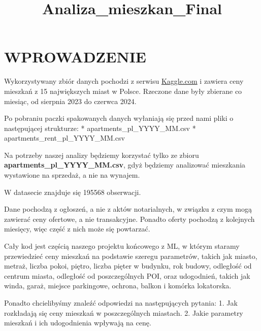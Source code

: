 \documentclass[11pt]{article}
\title{Analiza\_mieszkan\_Final}
\begin{document}
    
    \maketitle
    
    

    
    \section{WPROWADZENIE}\label{wprowadzenie}

Wykorzystywany zbiór danych pochodzi z serwisu
\href{https://www.kaggle.com/datasets/krzysztofjamroz/apartment-prices-in-poland/data}{Kaggle.com}
i zawiera ceny mieszkań z 15 największych miast w Polsce. Rzeczone dane
były zbierane co miesiąc, od sierpnia 2023 do czerwca 2024.

Po pobraniu paczki spakowanych danych wyłaniają się przed nami pliki o
następującej strukturze: * apartments\_pl\_YYYY\_MM.csv *
apartments\_rent\_pl\_YYYY\_MM.csv

Na potrzeby naszej analizy będziemy korzystać tylko ze zbioru
\textbf{apartments\_pl\_YYYY\_MM.csv}, gdyż będziemy analizować
mieszkania wystawione na sprzedaż, a nie na wynajem.

W datasecie znajduje się 195568 obserwacji.

Dane pochodzą z ogłoszeń, a nie z aktów notarialnych, w związku z czym
mogą zawierać ceny ofertowe, a nie transakcyjne. Ponadto oferty pochodzą
z kolejnych miesięcy, więc część z nich może się powtarzać.

Cały kod jest częścią naszego projektu końcowego z ML, w którym staramy
przewiedzieć ceny mieszkań na podstawie szeregu parametrów, takich jak
miasto, metraż, liczba pokoi, piętro, liczba pięter w budynku, rok
budowy, odległość od centrum miasta, odległość od poszczególnych POI,
oraz udogodnień, takich jak winda, garaż, miejsce parkingowe, ochrona,
balkon i komórka lokatorska.

Ponadto chcielibyśmy znaleźć odpowiedzi na następujących pytania: 1. Jak
rozkładają się ceny mieszkań w poszczególnych miastach. 2. Jakie
parametry mieszkań i ich udogodnienia wpływają na cenę.
\end{document}
